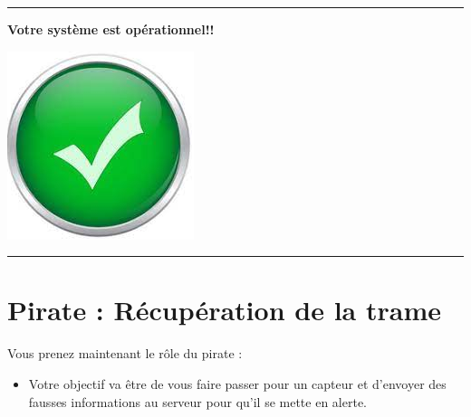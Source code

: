 \documentclass[french, 12pt]{article}%
\newcommand{\itemE}{\item[$\bullet$]}
\begin{document}
\vspace{0.5cm}
\begin{center}
 \rule{0.75\linewidth}{1pt}
\end{center}
\begin{minipage}[c]{0.59\linewidth}

\textbf{Votre système est opérationnel!!}
\end{minipage}
\begin{minipage}[c]{0.4\linewidth}
\begin{center}
\includegraphics[scale=0.1]{./ressource/OKLogo}
\end{center}
\end{minipage}
\begin{center}
 \rule{0.75\linewidth}{1pt}
\end{center}

\newpage
\section{Pirate : Récupération de la trame}

Vous prenez maintenant le rôle du pirate : 
\begin{itemize}
\itemE Votre objectif va être de vous faire passer pour un capteur et d'envoyer des fausses informations au serveur pour qu'il se mette en alerte.  
\end{itemize}
\end{document}
